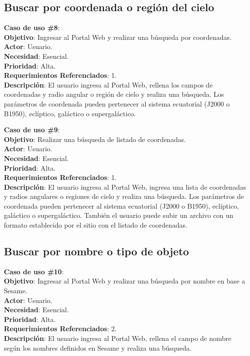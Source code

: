 \subsection{Buscar por coordenada o región del cielo}
\noindent\textbf{Caso de uso \#8}: \\
\noindent\textbf{Objetivo}: Ingresar al Portal Web y realizar una búsqueda por coordenadas. \\
\textbf{Actor}: Usuario. \\
\textbf{Necesidad}: Esencial. \\
\textbf{Prioridad}: Alta. \\
\textbf{Requerimientos Referenciados}: 1. \\
\textbf{Descripción}: El usuario ingresa al Portal Web, rellena los campos de coordenadas y radio angular o región de cielo y realiza una búsqueda. Los parámetros de coordenada pueden pertenecer al sistema ecuatorial (J2000 o B1950), eclíptico, galáctico o supergaláctico.
\vspace{1.0cm}

\noindent\textbf{Caso de uso \#9}: \\
\noindent\textbf{Objetivo}: Realizar una búsqueda de listado de coordenadas. \\
\textbf{Actor}: Usuario. \\
\textbf{Necesidad}: Esencial. \\
\textbf{Prioridad}: Alta. \\
\textbf{Requerimientos Referenciados}: 1. \\
\textbf{Descripción}: El usuario ingresa al Portal Web, ingresa una lista de coordenadas y radios angulares o regiones de cielo y realiza una búsqueda. Los parámetros de coordenada pueden pertenecer al sistema ecuatorial (J2000 o B1950), eclíptico, galáctico o supergaláctico. También el usuario puede subir un archivo con un formato establecido por el sitio con el listado de coordenadas.
\vspace{1.0cm}

\subsection{Buscar por nombre o tipo de objeto}
\noindent\textbf{Caso de uso \#10}: \\
\noindent\textbf{Objetivo}: Ingresar al Portal Web y realizar una búsqueda por nombre en base a Sesame. \\
\textbf{Actor}: Usuario.\\
\textbf{Necesidad}: Esencial.\\
\textbf{Prioridad}: Alta.\\
\textbf{Requerimientos Referenciados}: 2. \\
\textbf{Descripción}: El usuario ingresa al Portal Web, rellena el campo de nombre según los nombres definidos en Sesame y realiza una búsqueda.
\vspace{1.0cm}

